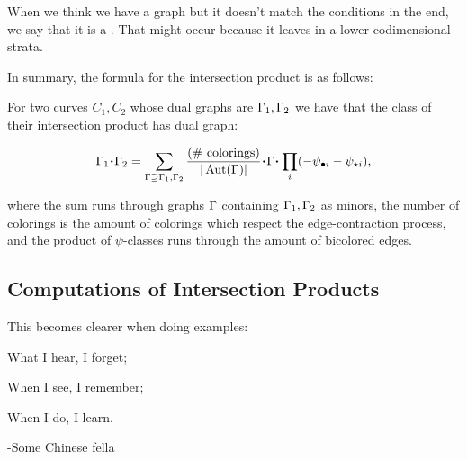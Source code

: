 \documentclass[12pt]{memoir}
\begin{document}
\begin{Rmk}
    When we think we have a graph but it doesn't match the conditions in the end, we say that it is a . That might occur because it leaves in a lower codimensional strata.
\end{Rmk}

In summary, the formula for the intersection product is as follows:

\begin{Prop}\label{prop-intersection-prod-formula-for-dual-graphs}
    For two curves \(C_1,C_2\) whose dual graphs are \(\Gamma_1,\Gamma_2\) we have that the class of their intersection product has dual graph:

    \[\Ga_1\.\Ga_2=\sum_{\Ga\supseteq\Ga_1,\Ga_2}\frac{(\#\text{ colorings})}{|\Aut(\Ga)|}\.\Ga\.\prod_{i}(-\psi_{\8 i}-\psi_{\star i}),\]

    where the sum runs through graphs \(\Gamma\) containing \(\Gamma_1,\Gamma_2\) as minors, the number of colorings is the amount of colorings which respect the edge-contraction process, and the product of \(\psi\)-classes runs through the amount of bicolored edges.
\end{Prop}


\subsection{Computations of Intersection Products}
This becomes clearer when doing examples:

\begin{significant}
    What I hear, I forget;\par
    When I see, I remember;\par
    When I do, I learn.\par
    -Some Chinese fella
\end{significant}
\end{document}
